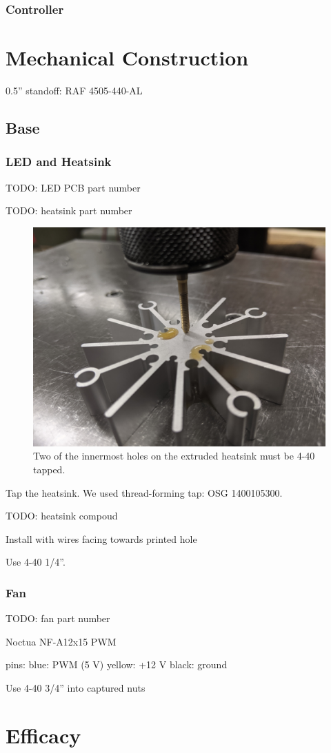 \documentclass[11pt]{article}
\let\stdsection\section
\renewcommand\section{\clearpage\stdsection}
\begin{document}


\subsubsection{Controller}

\clearpage
\section{Mechanical Construction}

0.5'' standoff: RAF 4505-440-AL

\subsection{Base}

\subsubsection{LED and Heatsink}

TODO: LED PCB part number

TODO: heatsink part number

\begin{figure}
  \centering
  \includegraphics[width=\textwidth/2]{"../pictures/tap-heatsink.jpg"}
  \caption{Two of the innermost holes on the extruded heatsink must be 4-40 tapped.}
\end{figure}

Tap the heatsink.
We used thread-forming tap: OSG 1400105300.

TODO: heatsink compoud

Install with wires facing towards printed hole

Use 4-40 1/4''.

\subsubsection{Fan}

TODO: fan part number

Noctua NF-A12x15 PWM

pins:
blue: PWM (5 V)
yellow: +12 V
black: ground

Use 4-40 3/4'' into captured nuts

\section{Efficacy}
\end{document}
